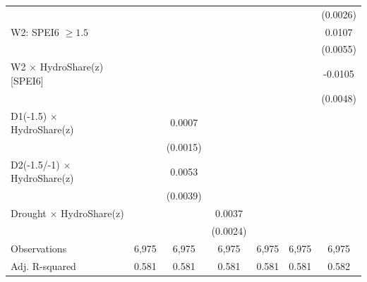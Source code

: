 {\begin{tabular}{l*{6}{c}}
                    &                     &                     &                     &                     &                     &    (0.0026)         \\
\addlinespace
W2: SPEI6 $\geq 1.5$&                     &                     &                     &                     &                     &      0.0107\sym{*}  \\
                    &                     &                     &                     &                     &                     &    (0.0055)         \\
\addlinespace
W2 $\times$ HydroShare(z) [SPEI6]&                     &                     &                     &                     &                     &     -0.0105\sym{**} \\
                    &                     &                     &                     &                     &                     &    (0.0048)         \\
\addlinespace
D1(-1.5) $\times$ HydroShare(z)&                     &      0.0007         &                     &                     &                     &                     \\
                    &                     &    (0.0015)         &                     &                     &                     &                     \\
\addlinespace
D2(-1.5/-1) $\times$ HydroShare(z)&                     &      0.0053         &                     &                     &                     &                     \\
                    &                     &    (0.0039)         &                     &                     &                     &                     \\
\addlinespace
Drought $\times$ HydroShare(z)&                     &                     &      0.0037         &                     &                     &                     \\
                    &                     &                     &    (0.0024)         &                     &                     &                     \\
\midrule
Observations        &       6,975         &       6,975         &       6,975         &       6,975         &       6,975         &       6,975         \\
Adj. R-squared      &       0.581         &       0.581         &       0.581         &       0.581         &       0.581         &       0.582         \\

\end{tabular}}
